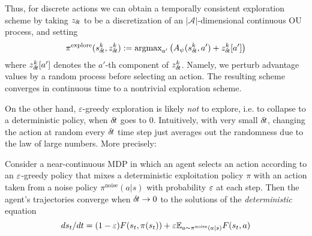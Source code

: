 Thus, for discrete actions we can obtain a temporally consistent
exploration scheme by taking
$z_{\delta\hspace{-.1em}t}$ to be a discretization of an $|\mathcal{A}|$-dimensional
continuous OU process, and setting
\begin{equation}
  \pi^\text{explore}(s^k_{\delta\hspace{-.1em}t}, z^k_{\delta\hspace{-.1em}t})\mathrel{\mathop{:}}= \text{argmax}_{a'} \left(A_\psi(s^k_{\delta\hspace{-.1em}t}, a') + z^k_{\delta\hspace{-.1em}t}[a']\right)
\end{equation}
where $z^k_{\delta\hspace{-.1em}t}[a']$ denotes the $a'$-th component of $z^k_{\delta\hspace{-.1em}t}$. Namely,
we perturb advantage values by a random process before selecting an action. The
resulting scheme converges in continuous time to a nontrivial exploration
scheme.

On the other hand,
$\varepsilon$-greedy
exploration is likely \emph{not} to explore, i.e. to collapse to a deterministic
policy, when ${\delta\hspace{-.1em}t}$ goes to $0$.
Intuitively,
with very small ${\delta\hspace{-.1em}t}$, changing the action at random every ${\delta\hspace{-.1em}t}$ time
step just averages out the randomness due to the law of large numbers.
More precisely:%


\begin{theorem}
Consider a near-continuous MDP in which an agent selects an
action according to an $\varepsilon$-greedy policy that mixes a deterministic
exploitation policy $\pi$ with an action taken from a noise policy
$\pi^\text{noise}(a|s)$ with probability $\varepsilon$ at each step. Then the
agent's trajectories converge when ${\delta\hspace{-.1em}t}\to 0$ to the solutions of the
\emph{deterministic} equation
\begin{equation}
d s_t/dt= (1-\varepsilon) F(s_t,\pi(s_t))+\varepsilon \mathbb{E}_{a\sim
\pi^\text{noise}(a|s)}F(s_t,a)
\end{equation}
\end{theorem}

